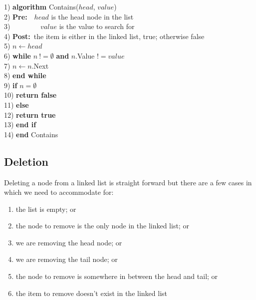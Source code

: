 \begin{tabbing}
1)  \textbf{alg}\= \textbf{orithm} Contains($head$, $value$) \\
2)  \> \textbf{Pre:}~~$head$ is the head node in the list \\
3)  \> ~~~~~~~~$value$ is the value to search for \\
4)  \> \textbf{Post:}~the item is either in the linked list, true; otherwise false \\
5)  \> $n \leftarrow head$ \\
6)  \> \textbf{whi}\= \textbf{le} $n~!= \emptyset$ \textbf{and} $n$.Value $!= value$ \\
7)  \> \> $n \leftarrow n$.Next \\
8)  \> \textbf{end while} \\
9)  \> \textbf{if} $n = \emptyset$ \\
10) \> \> \textbf{return false} \\
11) \> \textbf{else} \\
12) \> \> \textbf{return true} \\
13) \> \textbf{end if} \\
14) \textbf{end} Contains \\
\end{tabbing}

\subsection{Deletion} \label{single_deletion}
Deleting a node from a linked list is straight forward but there are a few cases in which we need to accommodate for:
\begin{enumerate}
\item the list is empty; or
\item the node to remove is the only node in the linked list; or 
\item we are removing the head node; or
\item we are removing the tail node; or
\item the node to remove is somewhere in between the head and tail; or
\item the item to remove doesn't exist in the linked list
\end{enumerate}

